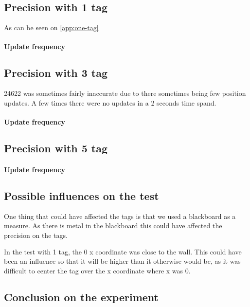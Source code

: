 \subsection{Precision with 1 tag} \label{sec:one-tag-precision}
As can be seen on \autoref{app:one-tag}

\paragraph{Update frequency}

\subsection{Precision with 3 tag}

24622 was sometimes fairly inaccurate due to there sometimes being few position updates. 
A few times there were no updates in a 2 seconds time spand.    

\paragraph{Update frequency}

\subsection{Precision with 5 tag}

\paragraph{Update frequency}

\subsection{Possible influences on the test}
One thing that could have affected the tags is that we used a blackboard as a measure. 
As there is metal in the blackboard this could have affected the precision on the tags.

In the test with 1 tag, the 0 x coordinate was close to the wall. 
This could have been an influence so that it will be higher than it otherwise would be, as it was difficult to center the tag over the x coordinate where x was 0.

\subsection{Conclusion on the experiment}